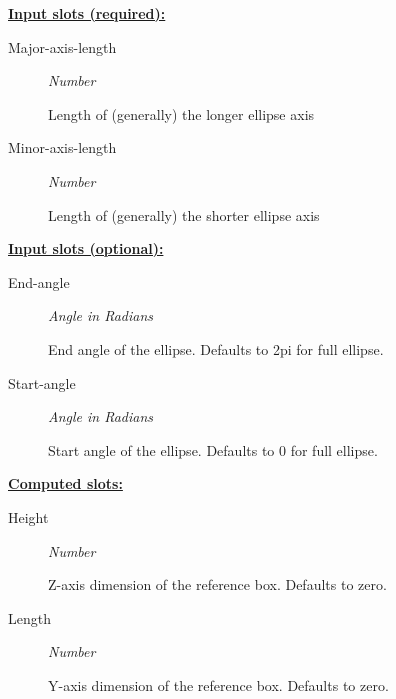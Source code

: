 \documentclass [11pt]{book}
\begin{document}
\begin{itemize}
\textbf{
\underline{Input slots (required):}}

\begin{description}

\item [Major-axis-length]
\emph{Number}

 Length of (generally) the longer ellipse axis




\item [Minor-axis-length]
\emph{Number}

 Length of (generally) the shorter ellipse axis




\end{description}






\textbf{
\underline{Input slots (optional):}}

\begin{description}

\item [End-angle]
\emph{Angle in Radians}

 End angle of the ellipse. Defaults to 2pi for full ellipse.




\item [Start-angle]
\emph{Angle in Radians}

 Start angle of the ellipse. Defaults to 0 for full ellipse.




\end{description}






\textbf{
\underline{Computed slots:}}

\begin{description}

\item [Height]
\emph{Number}

 Z-axis dimension of the reference box. Defaults to zero.




\item [Length]
\emph{Number}

 Y-axis dimension of the reference box. Defaults to zero.





\end{description}
\end{itemize}
\end{document}
